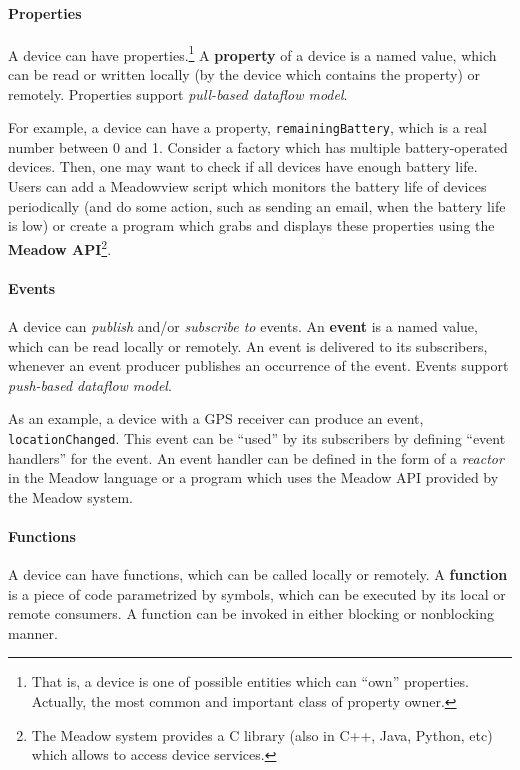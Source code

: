 \documentclass{note}
\begin{document}
\paragraph{Properties}
A device can have properties.\footnote{\textcolor{green2}{That is, a device is
    one of possible entities which can ``own'' properties. Actually, the most
    common and important class of property owner.}} A
  \textcolor{blue2}{\bf{}property} 
of a device is a named value, which can be read or written
locally (by the device which contains the property) or remotely.
Properties support {\em pull-based dataflow model\/}.

For example, a device can have a property,
\textcolor{red2}{\texttt{remainingBattery}}, which is a real number
between 0 and 1. Consider a factory which has multiple battery-operated
devices. Then, one may want to check if all devices have enough battery life. 
Users can add a Meadowview script which monitors the battery life of devices
periodically (and do some action, such as sending an email, when the
battery life is low)  
or create a program which grabs and displays these properties
using the \textcolor{blue2}{\bf{}Meadow API}\footnote{\textcolor{green2}{The
    Meadow system provides a C library (also in C++, Java, Python, etc) which
    allows to access device services.}}.


\paragraph{Events}
A device can {\em publish\/} and/or {\em subscribe to\/} events.
An \textcolor{blue2}{\bf{}event} is a named value, 
which can be read locally or remotely. 
An event is delivered to its subscribers, whenever
an event producer publishes an occurrence of the event.
Events support {\em push-based dataflow model\/}.

As an example, a device with a GPS receiver can produce an event,
\textcolor{red2}{\texttt{locationChanged}}. 
This event can be ``used'' by its subscribers by defining ``event handlers''
for the event. An event handler can be defined in the form of a {\em
  reactor\/} in the Meadow language or a program which uses the Meadow API
provided by the Meadow system.


\paragraph{Functions}
A device can have functions, which can be called locally or remotely.
A \textcolor{blue2}{\bf{}function} is a piece of code parametrized by
symbols, which can be executed by its local or remote consumers.
A function can be invoked in either blocking or nonblocking manner.
\end{document}
